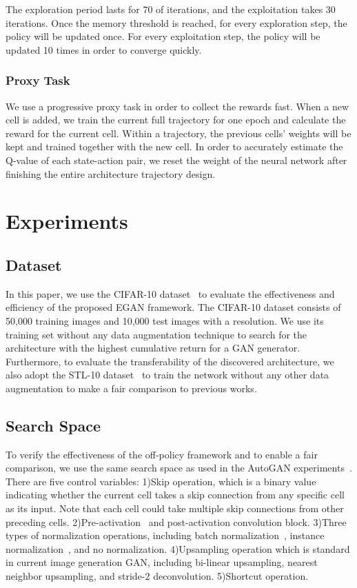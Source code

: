 \documentclass[runningheads]{llncs}
\begin{document}
The exploration period lasts for 70 of iterations, and the exploitation takes 30 iterations. Once the memory threshold is reached, for every exploration step, the policy will be updated once. For every exploitation step, the policy will be updated 10 times in order to  converge quickly. 

\subsubsection{Proxy Task}
We use a progressive proxy task in order to collect the rewards fast. When a new cell is added, we train the current full trajectory for one epoch and calculate the reward for the current cell. Within a trajectory, the previous cells' weights will be kept and trained together with the new cell. In order to accurately estimate the Q-value of each state-action pair, we reset the weight of the neural network after finishing the entire architecture trajectory design. 


\section{Experiments} \label{experiments}


\subsection{Dataset}
In this paper, we use the CIFAR-10 dataset~\cite{krizhevsky2009learning} to evaluate the effectiveness and efficiency of the proposed EGAN framework. The CIFAR-10 dataset consists of 50,000 training images and 10,000 test images with a  resolution. We use its training set without any data augmentation technique to search for the architecture with the highest cumulative return for a GAN generator.
Furthermore, to evaluate the transferability of the discovered architecture, we also adopt the STL-10 dataset~\cite{coates2011analysis} to train the network without any other data augmentation to make a fair comparison to previous works.
\subsection{Search Space} 
To verify the effectiveness of the off-policy framework and to enable a  fair comparison, we use the same search space as used in the AutoGAN experiments~\cite{gong2019autogan}. There are five control variables: 1)Skip operation, which is a binary value indicating whether the current cell takes a skip connection from any specific cell as its input. Note that each cell could take multiple skip connections from other preceding cells. 2)Pre-activation~\cite{he2016identity} and post-activation convolution block. 3)Three types of normalization operations, including batch normalization~\cite{ioffe2015batch}, instance normalization~\cite{ulyanov2016instance}, and no normalization. 4)Upsampling operation which is standard in current image generation GAN, including bi-linear upsampling, nearest neighbor upsampling, and stride-2 deconvolution. 5)Shortcut operation.
\end{document}

